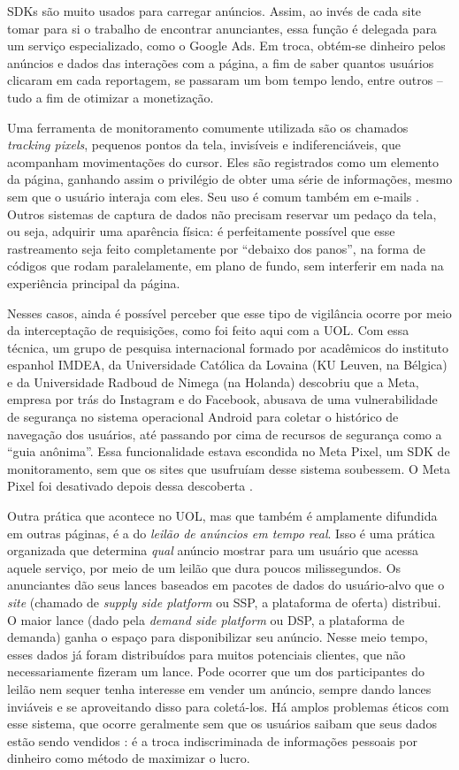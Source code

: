 SDKs são muito usados para carregar anúncios.
Assim, ao invés de cada site tomar para si o trabalho de encontrar anunciantes, essa função é delegada para um serviço especializado, como o Google Ads.
Em troca, obtém-se dinheiro pelos anúncios e dados das interações com a página, a fim de saber quantos usuários clicaram em cada reportagem, se passaram um bom tempo lendo, entre outros -- tudo a fim de otimizar a monetização.

Uma ferramenta de monitoramento comumente utilizada são os chamados \textit{tracking pixels}, pequenos pontos da tela, invisíveis e indiferenciáveis, que acompanham movimentações do cursor.
Eles são registrados como um elemento da página, ganhando assim o privilégio de obter uma série de informações, mesmo sem que o usuário interaja com eles.
Seu uso é comum também em e-mails \cite{kelion_spy_2021}.
Outros sistemas de captura de dados não precisam reservar um pedaço da tela, ou seja, adquirir uma aparência física: é perfeitamente possível que esse rastreamento seja feito completamente por ``debaixo dos panos'', na forma de códigos que rodam paralelamente, em plano de fundo, sem interferir em nada na experiência principal da página.

Nesses casos, ainda é possível perceber que esse tipo de vigilância ocorre por meio da interceptação de requisições, como foi feito aqui com a UOL.
Com essa técnica, um grupo de pesquisa internacional formado por acadêmicos do instituto espanhol IMDEA, da Universidade Católica da Lovaina (KU Leuven, na Bélgica) e da Universidade Radboud de Nimega (na Holanda) descobriu que a Meta, empresa por trás do Instagram e do Facebook, abusava de uma vulnerabilidade de segurança no sistema operacional Android para coletar o histórico de navegação dos usuários, até passando por cima de recursos de segurança como a ``guia anônima''.
Essa funcionalidade estava escondida no Meta Pixel, um SDK de monitoramento, sem que os sites que usufruíam desse sistema soubessem. 
O Meta Pixel foi desativado depois dessa descoberta \cite{girish_disclosure_2025, teixeira_meta_2025}.

Outra prática que acontece no UOL, mas que também é amplamente difundida em outras páginas, é a do \textit{leilão de anúncios em tempo real}. 
Isso é uma prática organizada que determina \textit{qual} anúncio mostrar para um usuário que acessa aquele serviço, por meio de um leilão que dura poucos milissegundos.
Os anunciantes dão seus lances baseados em pacotes de dados do usuário-alvo que o \textit{site} (chamado de \textit{supply side platform} ou SSP, a plataforma de oferta) distribui.
O maior lance (dado pela \textit{demand side platform} ou DSP, a plataforma de demanda) ganha o espaço para disponibilizar seu anúncio.
Nesse meio tempo, esses dados já foram distribuídos para muitos potenciais clientes, que não necessariamente fizeram um lance.
Pode ocorrer que um dos participantes do leilão nem sequer tenha interesse em vender um anúncio, sempre dando lances inviáveis e se aproveitando disso para coletá-los.
Há amplos problemas éticos com esse sistema, que ocorre geralmente sem que os usuários saibam que seus dados estão sendo vendidos \cite{bashir_privacy_2019}: é a troca indiscriminada de informações pessoais por dinheiro como método de maximizar o lucro.


